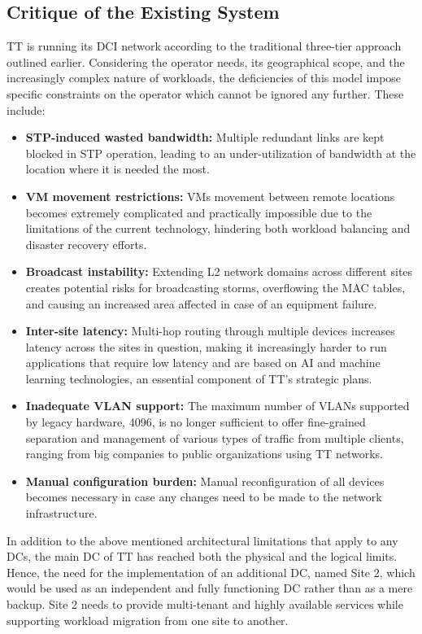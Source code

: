 \subsection{Critique of the Existing System}
TT is running its DCI network according to the traditional three-tier approach outlined earlier. Considering the operator needs, its geographical scope, and the increasingly complex nature of workloads, the deficiencies of this model impose specific constraints on the operator which cannot be ignored any further. These include:
\begin{itemize}
    \item \textbf{STP-induced wasted bandwidth:} Multiple redundant links are kept blocked in STP operation, leading to an under-utilization of bandwidth at the location where it is needed the most.
    \item \textbf{VM movement restrictions:} VMs movement between remote locations becomes extremely complicated and practically impossible due to the limitations of the current technology, hindering both workload balancing and disaster recovery efforts.
    \item \textbf{Broadcast instability:} Extending L2 network domains across different sites creates potential risks for broadcasting storms, overflowing the MAC tables, and causing an increased area affected in case of an equipment failure.
    \item \textbf{Inter-site latency:} Multi-hop routing through multiple devices increases latency across the sites in question, making it increasingly harder to run applications that require low latency and are based on AI and machine learning technologies, an essential component of TT’s strategic plans.
    \item \textbf{Inadequate VLAN support:} The maximum number of VLANs supported by legacy hardware, 4096, is no longer sufficient to offer fine-grained separation and management of various types of traffic from multiple clients, ranging from big companies to public organizations using TT networks.
    \item \textbf{Manual configuration burden:} Manual reconfiguration of all devices becomes necessary in case any changes need to be made to the network infrastructure.
\end{itemize}
In addition to the above mentioned architectural limitations that apply to any DCs, the main DC of TT has reached both the physical and the logical limits. Hence, the need for the implementation of an additional DC, named Site 2, which would be used as an independent and fully functioning DC rather than as a mere backup. Site 2 needs to provide multi-tenant and highly available services while supporting workload migration from one site to another.

